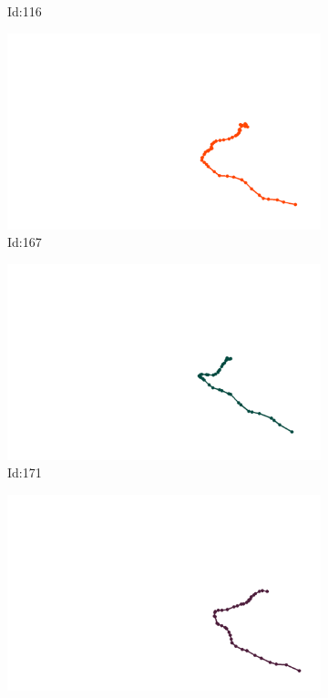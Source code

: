 \documentclass[12pt,twoside]{report}
\begin{document}
\begin{figure}
\begin{subfigure}[b]{0.20\textwidth}
\caption{Id:116}
\end{subfigure}
\begin{subfigure}[b]{0.20\textwidth}
\centering
\includegraphics[width=\textwidth]{../trajectories/167.png}
\caption{Id:167}
\end{subfigure}
\begin{subfigure}[b]{0.20\textwidth}
\centering
\includegraphics[width=\textwidth]{../trajectories/171.png}
\caption{Id:171}
\end{subfigure}
\begin{subfigure}[b]{0.20\textwidth}
\centering
\includegraphics[width=\textwidth]{../trajectories/183.png}

\end{subfigure}
\end{figure}
\end{document}
